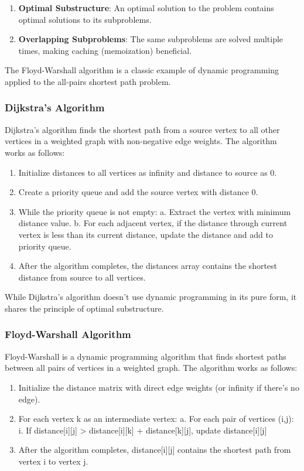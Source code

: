 \documentclass[a4paper,12pt]{article}
\begin{document}
\begin{enumerate}
\item \textbf{\textbf{Optimal Substructure}}: An optimal solution to the problem contains optimal solutions to its subproblems.
\item \textbf{\textbf{Overlapping Subproblems}}: The same subproblems are solved multiple times, making caching (memoization) beneficial.
\end{enumerate}

The Floyd-Warshall algorithm is a classic example of dynamic programming applied to the all-pairs shortest path problem.
\subsubsection{Dijkstra's Algorithm}
\label{sec:orgfc0ab27}
Dijkstra's algorithm finds the shortest path from a source vertex to all other vertices in a weighted graph with non-negative edge weights. The algorithm works as follows:

\begin{enumerate}
\item Initialize distances to all vertices as infinity and distance to source as 0.
\item Create a priority queue and add the source vertex with distance 0.
\item While the priority queue is not empty:
a. Extract the vertex with minimum distance value.
b. For each adjacent vertex, if the distance through current vertex is less than its current distance, update the distance and add to priority queue.
\item After the algorithm completes, the distances array contains the shortest distance from source to all vertices.
\end{enumerate}

While Dijkstra's algorithm doesn't use dynamic programming in its pure form, it shares the principle of optimal substructure.
\subsubsection{Floyd-Warshall Algorithm}
\label{sec:orga054842}
Floyd-Warshall is a dynamic programming algorithm that finds shortest paths between all pairs of vertices in a weighted graph. The algorithm works as follows:

\begin{enumerate}
\item Initialize the distance matrix with direct edge weights (or infinity if there's no edge).
\item For each vertex k as an intermediate vertex:
a. For each pair of vertices (i,j):
   i. If distance[i][j] > distance[i][k] + distance[k][j], update distance[i][j]
\item After the algorithm completes, distance[i][j] contains the shortest path from vertex i to vertex j.
\end{enumerate}
\end{document}
